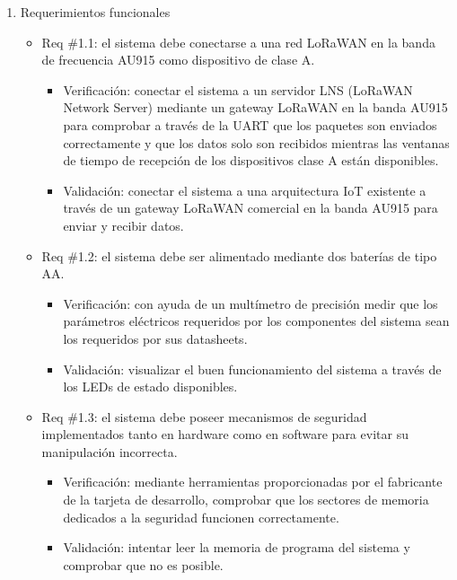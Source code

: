 \documentclass[
11pt, %
]{plan}
\begin{document}
\begin{enumerate}
	\item Requerimientos funcionales
		\begin{itemize}
			\item Req \#1.1: el sistema debe conectarse a una red LoRaWAN en la banda de frecuencia AU915 como dispositivo de clase A.

			\begin{itemize}
				\item Verificación: conectar el sistema a un servidor LNS (LoRaWAN Network Server) mediante un gateway LoRaWAN en la banda AU915 para comprobar a través de la UART que los paquetes son enviados correctamente y que los datos solo son recibidos mientras las ventanas de tiempo de recepción de los dispositivos clase A están disponibles.
				\item Validación: conectar el sistema a una arquitectura IoT existente a través de un gateway LoRaWAN comercial en la banda AU915 para enviar y recibir datos.
			\end{itemize}

		\end{itemize}
		
		\begin{itemize}
			\item Req \#1.2: el sistema debe ser alimentado mediante dos baterías de tipo AA.

			\begin{itemize}
				\item Verificación: con ayuda de un multímetro de precisión medir que los parámetros eléctricos requeridos por los componentes del sistema sean los requeridos por sus datasheets.
				\item Validación: visualizar el buen funcionamiento del sistema a través de los LEDs de estado disponibles.
			\end{itemize}

		\end{itemize}
		
		\begin{itemize}
			\item Req \#1.3: el sistema debe poseer mecanismos de seguridad implementados tanto en hardware como en software para evitar su manipulación incorrecta.

			\begin{itemize}
				\item Verificación: mediante herramientas proporcionadas por el fabricante de la tarjeta de desarrollo, comprobar que los sectores de memoria dedicados a la seguridad funcionen correctamente.
				\item Validación: intentar leer la memoria de programa del sistema y comprobar que no es posible.
			\end{itemize}


\end{itemize}
\end{enumerate}
\end{document}

